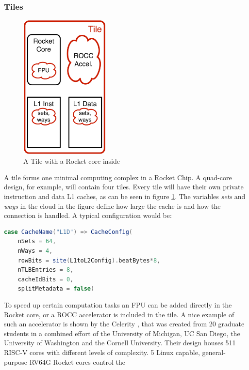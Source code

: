 \subsubsection{Tiles}
\begin{figure}
    \centering
    \includegraphics[width=0.4\textwidth]{figures/rocket_chip_tile}
    \caption{A Tile with a Rocket core inside \cite[p.~3]{risc-v_workshop_jan2015}}
    \label{fig:rocket_chip_tile}
\end{figure}
A tile forms one minimal computing complex in a
Rocket Chip. A quad-core design, for example,
will contain four tiles.
Every tile will have their own private instruction
and data L1 caches, as can be seen in figure
\ref{fig:rocket_chip_tile}. The variables \textit{sets} and
\textit{ways} in the cloud in the figure define how
large the cache is and how the connection is
handled. A typical configuration would be:
\begin{lstlisting}[language=scala, frame=single]
    case CacheName("L1D") => CacheConfig(
    nSets = 64,
    nWays = 4,
    rowBits = site(L1toL2Config).beatBytes*8,
    nTLBEntries = 8,
    cacheIdBits = 0,
    splitMetadata = false)
\end{lstlisting}
To speed up certain computation tasks an
FPU can be added directly in the Rocket core,
or a ROCC accelerator is included in the tile.
A nice example of such an accelerator is shown
by the Celerity \cite{celerity_manycore}, \cite{opencelerity_page}
that was created from 20 graduate
students in a combined effort of the University of
Michigan, UC San Diego, the University of 
Washington and the Cornell University.
Their design houses 511 RISC-V cores with
different levels of complexity.
5 Linux capable, general-purpose
RV64G Rocket cores control the
